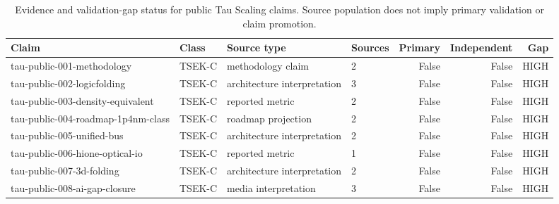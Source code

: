 \begin{table}[ht]
\centering
\small
\begin{tabular}{llllrrr}
\toprule
Claim & Class & Source type & Sources & Primary & Independent & Gap\\
\midrule
tau-public-001-methodology & TSEK-C & methodology claim & 2 & False & False & HIGH\\
tau-public-002-logicfolding & TSEK-C & architecture interpretation & 3 & False & False & HIGH\\
tau-public-003-density-equivalent & TSEK-C & reported metric & 2 & False & False & HIGH\\
tau-public-004-roadmap-1p4nm-class & TSEK-C & roadmap projection & 2 & False & False & HIGH\\
tau-public-005-unified-bus & TSEK-C & architecture interpretation & 2 & False & False & HIGH\\
tau-public-006-hione-optical-io & TSEK-C & reported metric & 1 & False & False & HIGH\\
tau-public-007-3d-folding & TSEK-C & architecture interpretation & 2 & False & False & HIGH\\
tau-public-008-ai-gap-closure & TSEK-C & media interpretation & 3 & False & False & HIGH\\
\bottomrule
\end{tabular}
\caption{Evidence and validation-gap status for public Tau Scaling claims. Source population does not imply primary validation or claim promotion.}
\label{tab:evidence-gap-status}
\end{table}
